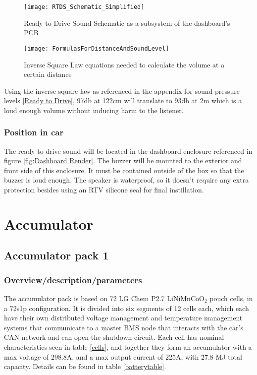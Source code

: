 \documentclass{article}
\begin{document}
\begin{figure}[h]
	\texttt{[image: RTDS\_Schematic\_Simplified]}
	\caption{Ready to Drive Sound Schematic as a subsystem of the dashboard's PCB}
\end{figure}
\begin{figure}[H]
	\texttt{[image: FormulasForDistanceAndSoundLevel]}
	\caption{Inverse Square Law equations needed to calculate the volume at a certain distance}
\end{figure}
Using the inverse square law as referenced in the appendix  for sound pressure levels \ref{Ready to Drive}, 97db at 122cm will translate to 93db at 2m which is a loud enough volume without inducing harm to the listener. 
\subsubsection{Position in car}
The ready to drive sound will be located in the dashboard enclosure referenced in figure \ref{fig:Dashboard Render}. The buzzer will be mounted
to the exterior and front side of this enclosure. It must be contained outside of the box so that the buzzer is
loud enough. The speaker is waterproof, so it doesn't require any extra protection besides using an RTV silicone seal for final instillation. 

\section{Accumulator}\label{accumulator}
\subsection{Accumulator pack 1}\label{accumulator_pack_1}
\subsubsection{Overview/description/parameters}\label{accumulator_overview}

The accumulator pack is based on 72 LG Chem P2.7 LiNiMnCoO$_{2}$ pouch cells, in a 72s1p configuration. It is divided into six segments of 12 cells each, which each have their own distributed voltage management and temperature management systems that communicate to a master BMS node that interacts with the car's CAN network and can open the shutdown circuit. Each cell has nominal characteristics seen in table \ref{cells}, and together they form an accumulator with a max voltage of 298.8A, and a max output current of 225A, with \~27.8 MJ total capacity. Details can be found in table \ref{batterytable}. 
\end{document}
